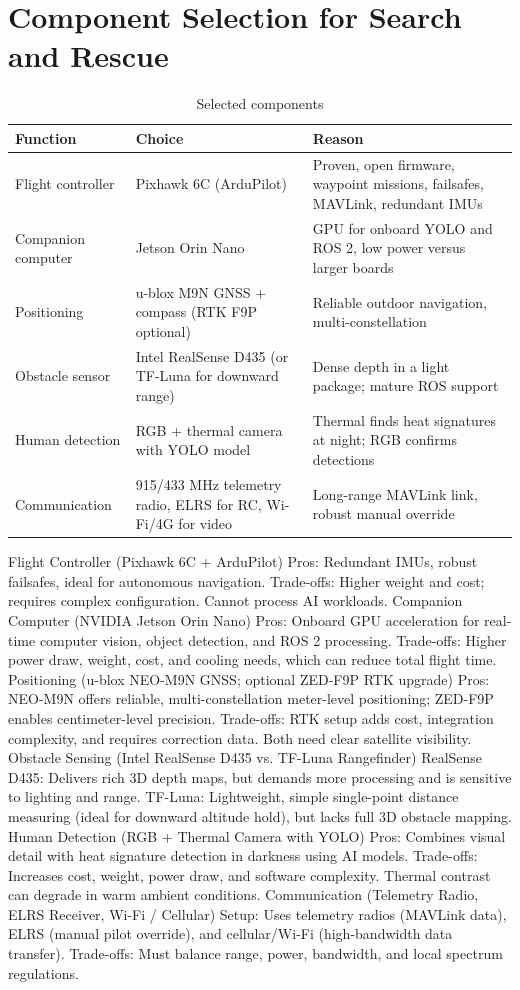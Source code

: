 \documentclass[conference]{IEEEtran}
\begin{document}
\section{Component Selection for Search and Rescue}
\begin{table}[h]
\centering\caption{Selected components}
\begin{tabular}{p{1.6cm}p{2.2cm}p{3.3cm}}\toprule
Function & Choice & Reason\\\midrule
Flight controller & Pixhawk 6C (ArduPilot) & Proven, open firmware, waypoint missions, failsafes, MAVLink, redundant IMUs \cite{pixhawk6c}\\
Companion computer & Jetson Orin Nano & GPU for onboard YOLO and ROS 2, low power versus larger boards \cite{jetson}\\
Positioning & u-blox M9N GNSS + compass (RTK F9P optional) & Reliable outdoor navigation, multi-constellation \cite{ublox}\\
Obstacle sensor & Intel RealSense D435 (or TF-Luna for downward range) & Dense depth in a light package; mature ROS support \cite{realsense}\\
Human detection & RGB + thermal camera with YOLO model & Thermal finds heat signatures at night; RGB confirms detections\\
Communication & 915/433 MHz telemetry radio, ELRS for RC, Wi-Fi/4G for video & Long-range MAVLink link, robust manual override \cite{elrs}\\\bottomrule
\end{tabular}
\end{table}
Flight Controller (Pixhawk 6C + ArduPilot)
    Pros: Redundant IMUs, robust failsafes, ideal for autonomous navigation.
    Trade-offs: Higher weight and cost; requires complex configuration. Cannot process AI workloads.
Companion Computer (NVIDIA Jetson Orin Nano)
    Pros: Onboard GPU acceleration for real-time computer vision, object detection, and ROS 2 processing.
    Trade-offs: Higher power draw, weight, cost, and cooling needs, which can reduce total flight time.
Positioning (u-blox NEO-M9N GNSS; optional ZED-F9P RTK upgrade)
    Pros: NEO-M9N offers reliable, multi-constellation meter-level positioning; ZED-F9P enables centimeter-level precision.
    Trade-offs: RTK setup adds cost, integration complexity, and requires correction data. Both need clear satellite visibility.
Obstacle Sensing (Intel RealSense D435 vs. TF-Luna Rangefinder)
    RealSense D435: Delivers rich 3D depth maps, but demands more processing and is sensitive to lighting and range.
    TF-Luna: Lightweight, simple single-point distance measuring (ideal for downward altitude hold), but lacks full 3D obstacle mapping.
Human Detection (RGB + Thermal Camera with YOLO)
    Pros: Combines visual detail with heat signature detection in darkness using AI models.
    Trade-offs: Increases cost, weight, power draw, and software complexity. Thermal contrast can degrade in warm ambient conditions.
Communication (Telemetry Radio, ELRS Receiver, Wi-Fi / Cellular)
    Setup: Uses telemetry radios (MAVLink data), ELRS (manual pilot override), and cellular/Wi-Fi (high-bandwidth data transfer).
    Trade-offs: Must balance range, power, bandwidth, and local spectrum regulations.
\end{document}
